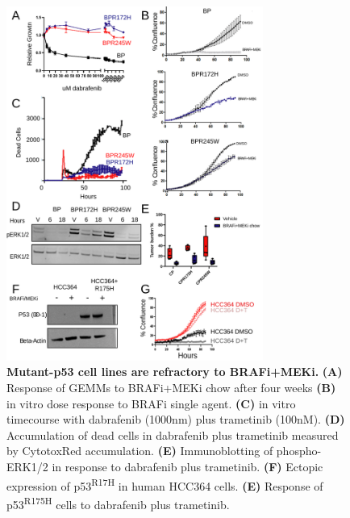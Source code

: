 \begin{figure}
\hypertarget{fig:13}{%
\centering
\includegraphics[width=0.75\textwidth,height=\textheight]{images/figure3_021722.svg}
\caption{\textbf{Mutant-p53 cell lines are refractory to BRAFi+MEKi.} \textbf{(A)} Response of GEMMs to BRAFi+MEKi chow after four weeks \textbf{(B)} in vitro dose response to BRAFi single agent. \textbf{(C)} in vitro timecourse with dabrafenib (1000nm) plus trametinib (100nM). \textbf{(D)} Accumulation of dead cells in dabrafenib plus trametinib measured by CytotoxRed accumulation. \textbf{(E)} Immunoblotting of phospho-ERK1/2 in response to dabrafenib plus trametinib. \textbf{(F)} Ectopic expression of p53\textsuperscript{R17H} in human HCC364 cells. \textbf{(E)} Response of p53\textsuperscript{R175H} cells to dabrafenib plus trametinib.}\label{fig:13}
}
\end{figure}

